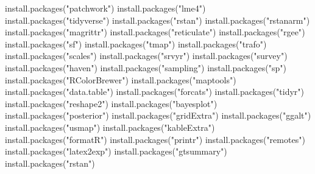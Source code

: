 \documentclass[
  letterpaper,
  DIV=11,
  numbers=noendperiod]{scrartcl}
\newenvironment{Shaded}{\begin{snugshade}}{\end{snugshade}}
\newcommand{\FunctionTok}[1]{\textcolor[rgb]{0.28,0.35,0.67}{#1}}
\newcommand{\NormalTok}[1]{\textcolor[rgb]{0.00,0.23,0.31}{#1}}
\newcommand{\StringTok}[1]{\textcolor[rgb]{0.13,0.47,0.30}{#1}}
\begin{document}
\begin{Shaded}
\begin{Highlighting}[]
\FunctionTok{install.packages}\NormalTok{(}\StringTok{"patchwork"}\NormalTok{)}
\FunctionTok{install.packages}\NormalTok{(}\StringTok{"lme4"}\NormalTok{)}
\FunctionTok{install.packages}\NormalTok{(}\StringTok{"tidyverse"}\NormalTok{)}
\FunctionTok{install.packages}\NormalTok{(}\StringTok{"rstan"}\NormalTok{)}
\FunctionTok{install.packages}\NormalTok{(}\StringTok{"rstanarm"}\NormalTok{)}
\FunctionTok{install.packages}\NormalTok{(}\StringTok{"magrittr"}\NormalTok{)}
\FunctionTok{install.packages}\NormalTok{(}\StringTok{"reticulate"}\NormalTok{) }
\FunctionTok{install.packages}\NormalTok{(}\StringTok{"rgee"}\NormalTok{) }
\FunctionTok{install.packages}\NormalTok{(}\StringTok{"sf"}\NormalTok{)}
\FunctionTok{install.packages}\NormalTok{(}\StringTok{"tmap"}\NormalTok{)}
\FunctionTok{install.packages}\NormalTok{(}\StringTok{"trafo"}\NormalTok{)}
\FunctionTok{install.packages}\NormalTok{(}\StringTok{"scales"}\NormalTok{)}
\FunctionTok{install.packages}\NormalTok{(}\StringTok{"srvyr"}\NormalTok{)}
\FunctionTok{install.packages}\NormalTok{(}\StringTok{"survey"}\NormalTok{)}
\FunctionTok{install.packages}\NormalTok{(}\StringTok{"haven"}\NormalTok{)}
\FunctionTok{install.packages}\NormalTok{(}\StringTok{"sampling"}\NormalTok{)}
\FunctionTok{install.packages}\NormalTok{(}\StringTok{"sp"}\NormalTok{)}
\FunctionTok{install.packages}\NormalTok{(}\StringTok{"RColorBrewer"}\NormalTok{)}
\FunctionTok{install.packages}\NormalTok{(}\StringTok{"maptools"}\NormalTok{)}
\FunctionTok{install.packages}\NormalTok{(}\StringTok{"data.table"}\NormalTok{)}
\FunctionTok{install.packages}\NormalTok{(}\StringTok{"forcats"}\NormalTok{)}
\FunctionTok{install.packages}\NormalTok{(}\StringTok{"tidyr"}\NormalTok{)}
\FunctionTok{install.packages}\NormalTok{(}\StringTok{"reshape2"}\NormalTok{)}
\FunctionTok{install.packages}\NormalTok{(}\StringTok{"bayesplot"}\NormalTok{)}
\FunctionTok{install.packages}\NormalTok{(}\StringTok{"posterior"}\NormalTok{)}
\FunctionTok{install.packages}\NormalTok{(}\StringTok{"gridExtra"}\NormalTok{)}
\FunctionTok{install.packages}\NormalTok{(}\StringTok{"ggalt"}\NormalTok{)}
\FunctionTok{install.packages}\NormalTok{(}\StringTok{"usmap"}\NormalTok{)}
\FunctionTok{install.packages}\NormalTok{(}\StringTok{"kableExtra"}\NormalTok{)}
\FunctionTok{install.packages}\NormalTok{(}\StringTok{"formatR"}\NormalTok{)}
\FunctionTok{install.packages}\NormalTok{(}\StringTok{"printr"}\NormalTok{)}
\FunctionTok{install.packages}\NormalTok{(}\StringTok{"remotes"}\NormalTok{)}
\FunctionTok{install.packages}\NormalTok{(}\StringTok{"latex2exp"}\NormalTok{)}
\FunctionTok{install.packages}\NormalTok{(}\StringTok{"gtsummary"}\NormalTok{)}
\FunctionTok{install.packages}\NormalTok{(}\StringTok{"rstan"}\NormalTok{)}
\end{Highlighting}
\end{Shaded}
\end{document}
